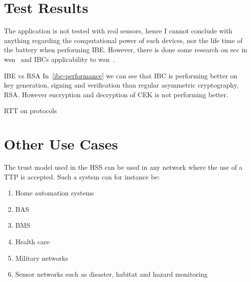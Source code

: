 \section{Test Results}
The application is not tested with real sensors, hence I cannot conclude with anything regarding the computational power of such devices, nor the life time of the battery when performing \gls{IBE}.
However, there is done some research on \gls{ecc} in \gls{wsn}~\cite{DBLP:conf/ipsn/LiuN08, DBLP:conf/ewsn/SzczechowiakOSCD08} and \gls{IBC}s applicability to \gls{wsn}~\cite{DBLP:journals/iacr/OliveiraAMDLD07}.

IBE vs RSA
In~\autoref{ibc-performance} we can see that \gls{IBC} is performing better on key generation, signing and verification than regular asymmetric cryptography, RSA. 
However encryption and decryption of \gls{CEK} is not performing better.

RTT on protocols



\section{Other Use Cases}
The trust model used in the \gls{HSS} can be used in any network where the use of a \gls{TTP} is accepted. 
Such a system can for instance be:
\begin{enumerate}
	\item Home automation systems
	\item \gls{BAS}
	\item \gls{BMS}
	\item Health care
	\item Military networks
	\item Sensor networks such as disaster, habitat and hazard monitoring
\end{enumerate}


